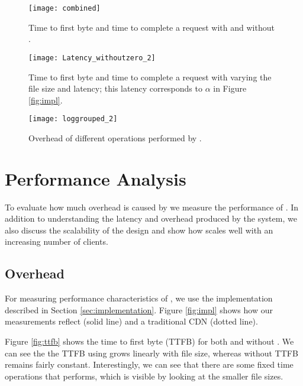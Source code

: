 \begin{figure*}[t!]
\vspace{-2mm}
  \begin{minipage}[t]{.31\linewidth}
    \centering
     \texttt{[image: combined]}
    \caption{Time to first byte and time to complete a request with and without \system{}.}
    \label{fig:completion}
  \end{minipage}
  \hfill
  \begin{minipage}[t]{.29\linewidth}
    \centering
    \texttt{[image: Latency\_withoutzero\_2]}
    \caption{Time to first byte and time to complete a request with varying the file size and latency; this latency 
corresponds to $\alpha$ in Figure \ref{fig:impl}.}
    \label{fig:latency}
  \end{minipage}
  \hfill
  \begin{minipage}[t]{.35\linewidth}
    \centering
    \texttt{[image: loggrouped\_2]}
\caption{Overhead of different operations performed by \system{}.}
\label{fig:overhead2}
  \end{minipage}
\end{figure*}


\section{Performance Analysis}
\label{sec:performance}
To evaluate how much overhead is caused by \system{} we measure the performance 
of \system{}.  In addition to understanding the latency and overhead produced by the 
system, we also discuss the scalability of the design and show how \system{} scales 
well with an increasing number of clients.

\subsection{\system{} Overhead}
For measuring performance characteristics of \system{}, we use the implementation 
described in Section \ref{sec:implementation}.  Figure \ref{fig:impl} shows 
how our measurements reflect \system{} (solid line) and a traditional CDN (dotted 
line).  

Figure \ref{fig:ttfb} shows the time to first byte (TTFB) for both \system{} and 
without \system{}.  We can see the the TTFB using \system{} grows linearly with 
file size, whereas without \system{} TTFB remains fairly constant.  Interestingly, 
we can see that there are some fixed time operations that \system{} performs, which 
is visible by looking at the smaller file sizes.

